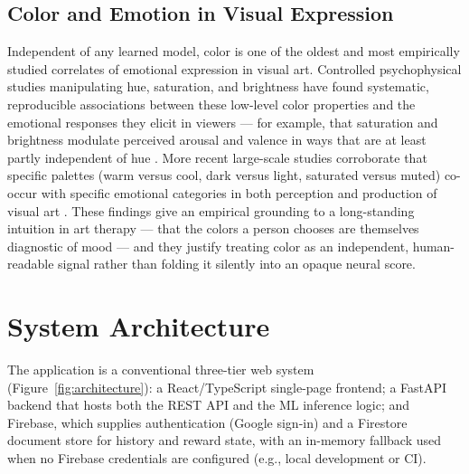 \documentclass[10pt,twocolumn,letterpaper]{article}
\begin{document}
\subsection{Color and Emotion in Visual Expression}

Independent of any learned model, color is one of the oldest and most empirically studied correlates of emotional expression in visual art. Controlled psychophysical studies manipulating hue, saturation, and brightness have found systematic, reproducible associations between these low-level color properties and the emotional responses they elicit in viewers --- for example, that saturation and brightness modulate perceived arousal and valence in ways that are at least partly independent of hue \cite{wilms2018color}. More recent large-scale studies corroborate that specific palettes (warm versus cool, dark versus light, saturated versus muted) co-occur with specific emotional categories in both perception and production of visual art \cite{colornature2024}. These findings give an empirical grounding to a long-standing intuition in art therapy --- that the colors a person chooses are themselves diagnostic of mood --- and they justify treating color as an independent, human-readable signal rather than folding it silently into an opaque neural score.

\section{System Architecture}
\label{sec:architecture}

The application is a conventional three-tier web system (Figure~\ref{fig:architecture}): a React/TypeScript single-page frontend; a FastAPI backend that hosts both the REST API and the ML inference logic; and Firebase, which supplies authentication (Google sign-in) and a Firestore document store for history and reward state, with an in-memory fallback used when no Firebase credentials are configured (e.g., local development or CI).
\end{document}
